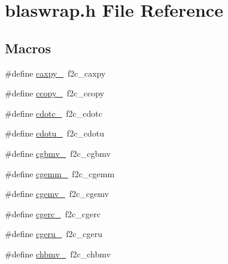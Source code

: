 \hypertarget{dependencies_2third-party_2clapack_23_82_81_2_i_n_c_l_u_d_e_2blaswrap_8h}{}\section{blaswrap.\+h File Reference}
\label{dependencies_2third-party_2clapack_23_82_81_2_i_n_c_l_u_d_e_2blaswrap_8h}
\subsection*{Macros}
\begin{DoxyCompactItemize}
\item 
\#define \hyperlink{dependencies_2third-party_2clapack_23_82_81_2_i_n_c_l_u_d_e_2blaswrap_8h_afc7f42478985f3c82998fe059a9fae51}{caxpy\+\_\+}~f2c\+\_\+caxpy
\item 
\#define \hyperlink{dependencies_2third-party_2clapack_23_82_81_2_i_n_c_l_u_d_e_2blaswrap_8h_a9066c9e75cc073c30a0010a9afc75431}{ccopy\+\_\+}~f2c\+\_\+ccopy
\item 
\#define \hyperlink{dependencies_2third-party_2clapack_23_82_81_2_i_n_c_l_u_d_e_2blaswrap_8h_acc31d8734db6dcd77368b7425b6ecda4}{cdotc\+\_\+}~f2c\+\_\+cdotc
\item 
\#define \hyperlink{dependencies_2third-party_2clapack_23_82_81_2_i_n_c_l_u_d_e_2blaswrap_8h_a2bc3ca8118adf0015135b460d64b4bad}{cdotu\+\_\+}~f2c\+\_\+cdotu
\item 
\#define \hyperlink{dependencies_2third-party_2clapack_23_82_81_2_i_n_c_l_u_d_e_2blaswrap_8h_af3a0c0d6cb3512f19cc66c271056f66a}{cgbmv\+\_\+}~f2c\+\_\+cgbmv
\item 
\#define \hyperlink{dependencies_2third-party_2clapack_23_82_81_2_i_n_c_l_u_d_e_2blaswrap_8h_a2e8687a1a5416a5cc424c27da34ee7bc}{cgemm\+\_\+}~f2c\+\_\+cgemm
\item 
\#define \hyperlink{dependencies_2third-party_2clapack_23_82_81_2_i_n_c_l_u_d_e_2blaswrap_8h_aee299f60c7be1f89e3d84bbc2479561d}{cgemv\+\_\+}~f2c\+\_\+cgemv
\item 
\#define \hyperlink{dependencies_2third-party_2clapack_23_82_81_2_i_n_c_l_u_d_e_2blaswrap_8h_a3907622ea5c6f7dedbffd054853e57ef}{cgerc\+\_\+}~f2c\+\_\+cgerc
\item 
\#define \hyperlink{dependencies_2third-party_2clapack_23_82_81_2_i_n_c_l_u_d_e_2blaswrap_8h_a3e06f7b1a67408ece0006c03064c6a83}{cgeru\+\_\+}~f2c\+\_\+cgeru
\item 
\#define \hyperlink{dependencies_2third-party_2clapack_23_82_81_2_i_n_c_l_u_d_e_2blaswrap_8h_a74daf84621950c187879aefffae850f2}{chbmv\+\_\+}~f2c\+\_\+chbmv

\end{DoxyCompactItemize}
